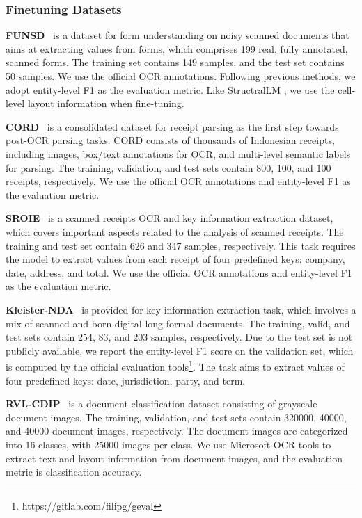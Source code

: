 \documentclass[11pt]{article}
\begin{document}
\subsubsection{Finetuning Datasets}

\textbf{FUNSD}~\cite{jain2019multimodal} is a dataset for form understanding on noisy scanned documents that aims at extracting values from forms, which comprises 199 real, fully annotated, scanned forms. The training set contains 149 samples, and the test set contains 50 samples. We use the official OCR annotations. Following previous methods, we adopt entity-level F1 as the evaluation metric. Like StructralLM \cite{li2021structurallm}, we use the cell-level layout information when fine-tuning.

\textbf{CORD}~\cite{park2019cord} is a consolidated dataset for receipt parsing as the first step towards post-OCR parsing tasks. CORD consists of thousands of Indonesian receipts, including images, box/text annotations for OCR, and multi-level semantic labels for parsing. The training, validation, and test sets contain 800, 100, and 100 receipts, respectively. We use the official OCR annotations and entity-level F1 as the evaluation metric.

\textbf{SROIE}~\cite{huang2019icdar2019} is a scanned receipts OCR and key information extraction dataset, which covers important aspects related to the analysis of scanned receipts. The training and test set contain 626 and 347 samples, respectively. This task requires the model to extract values from each receipt of four predefined keys: company, date, address, and total. We use the official OCR annotations and entity-level F1 as the evaluation metric. 

\textbf{Kleister-NDA}~\cite{gralinski2021kleister} is provided for key information extraction task, which involves a mix of scanned and born-digital long formal documents. The training, valid, and test sets contain 254, 83, and 203 samples, respectively. Due to the test set is not publicly available, we report the entity-level F1 score on the validation set, which is computed by the official evaluation tools\footnote{https://gitlab.com/filipg/geval}. The task aims to extract values of four predefined keys: date, jurisdiction, party, and term. 

\textbf{RVL-CDIP}~\cite{harley2015evaluation} is a document classification dataset consisting of grayscale document images. The training, validation, and test sets contain 320000, 40000, and 40000 document images, respectively. The document images are categorized into 16 classes, with 25000 images per class. We use Microsoft OCR tools to extract text and layout information from document images, and the evaluation metric is classification accuracy. 
\end{document}
